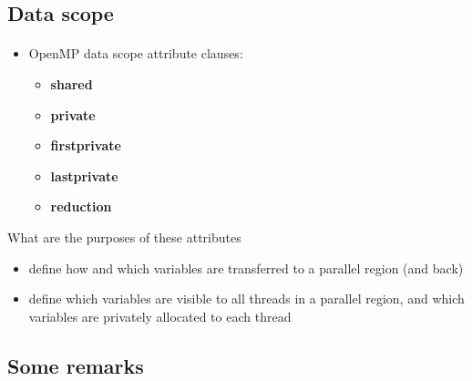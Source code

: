 \documentclass[%
oneside,                 %
final,                   %
10pt]{article}
\begin{document}
\subsection{Data scope}

\paragraph{}
\begin{itemize}
\item OpenMP data scope attribute clauses:
\begin{itemize}

 \item \textbf{shared}

 \item \textbf{private}

 \item \textbf{firstprivate}

 \item \textbf{lastprivate}

 \item \textbf{reduction}
\end{itemize}

\noindent
\end{itemize}

\noindent
What are the purposes of these attributes
\begin{itemize}
\item define how and which variables are transferred to a parallel region (and back)

\item define which variables are visible to all threads in a parallel region, and which variables are privately allocated to each thread
\end{itemize}

\noindent




\subsection{Some remarks}

\paragraph{}
\end{document}
